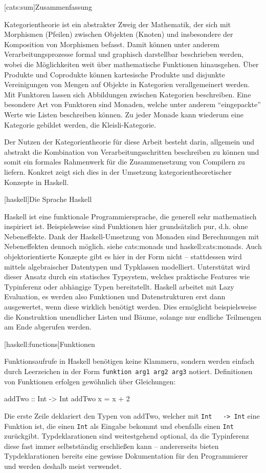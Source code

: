 \documentclass[11pt, a4paper, bibgerm]{scrbook}
\newenvironment{DIFnomarkup}{}{}
\newcommand\icode[1]{\lstinline?#1?}
\newcommand\lchapter{}
\newcommand\lsection{}
\newcommand\sref{}
\begin{document}
\lsection[cats:sum]{Zusammenfassung}

Kategorientheorie ist ein abstrakter Zweig der Mathematik, der sich mit
Morphismen (Pfeilen) zwischen Objekten (Knoten) und insbesondere der
Komposition von Morphismen befasst. Damit können unter anderem
Verarbeitungsprozesse formal und graphisch darstellbar beschrieben
werden, wobei die Möglichkeiten weit über mathematische Funktionen
hinausgehen. Über Produkte und Coprodukte können kartesische Produkte
und disjunkte Vereinigungen von Mengen auf Objekte in Kategorien
verallgemeinert werden. Mit Funktoren lassen sich Abbildungen zwischen
Kategorien beschreiben. Eine besondere Art von Funktoren sind Monaden,
welche unter anderem ``eingepackte'' Werte wie Listen beschreiben
können. Zu jeder Monade kann wiederum eine Kategorie gebildet werden,
die Kleisli-Kategorie.

Der Nutzen der Kategorientheorie für diese Arbeit besteht darin,
allgemein und abstrakt die Kombination von Verarbeitungsschritten
beschreiben zu können und somit ein formales Rahmenwerk für die
Zusammensetzung von Compilern zu liefern. Konkret zeigt sich dies in der
Umsetzung kategorientheoretischer Konzepte in Haskell.

\lchapter[haskell]{Die Sprache Haskell}

Haskell ist eine funktionale Programmiersprache, die generell sehr
mathematisch inspiriert ist. Beispielsweise sind Funktionen hier
grundsätzlich pur, d.h. ohne Nebeneffekte. Dank der Haskell-Umsetzung
von Monaden sind Berechnungen mit Nebeneffekten dennoch möglich. siehe
\sref{cats:monads} und \sref{haskell:cats:monads}. Auch
objektorientierte Konzepte gibt es hier in der Form nicht -- stattdessen
wird mittels algebraischer Datentypen und Typklassen
modelliert. Unterstützt wird dieser Ansatz durch ein statisches
Typsystem, welches praktische Features wie Typinferenz oder abhängige
Typen bereitstellt. Haskell arbeitet mit Lazy Evaluation, es werden also
Funktionen und Datenstrukturen erst dann ausgewertet, wenn diese
wirklich benötigt werden. Dies ermöglicht beispielsweise die
Konstruktion unendlicher Listen und Bäume, solange nur endliche
Teilmengen am Ende abgerufen werden.

\lsection[haskell:functions]{Funktionen}

Funktionsaufrufe in Haskell benötigen keine Klammern, sondern werden
einfach durch Leerzeichen in der Form \icode{funktion arg1 arg2 arg3}
notiert. Definitionen von Funktionen erfolgen gewöhnlich über
Gleichungen:
\begin{DIFnomarkup}\begin{code}
addTwo :: Int -> Int
addTwo x = x + 2  
\end{code}\end{DIFnomarkup}
Die erste Zeile deklariert den Typen von addTwo, welcher mit \icode{Int
  -> Int} eine Funktion ist, die einen \icode{Int} als Eingabe bekommt
und ebenfalls einen \icode{Int} zurückgibt. Typdeklarationen sind
weitestgehend optional, da die Typinferenz diese fast immer
selbstständig erschließen kann -- andererseits bieten Typdeklarationen
bereits eine gewisse Dokumentation für den Programmierer und werden
deshalb meist verwendet.
\end{document}

